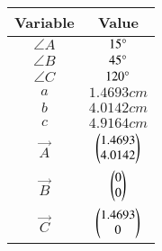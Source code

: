 \begin{tabular}[12pt]{ |c|c|}
    \hline
	\textbf{Variable} & \textbf{Value} \\
    \hline
	$\angle A$ & $15\degree$ \\
    \hline
	$\angle B$ & $45\degree$ \\
    \hline 
	$\angle C$ & $120\degree$ \\
    \hline
    $a$ & $1.4693cm$ \\
    \hline
	$b$ & $4.0142cm$ \\
    \hline 
	$c$ & $4.9164cm$ \\
    \hline
    $\vec{A}$ & $\begin{pmatrix}1.4693\\4.0142\end{pmatrix}$ \\
    \hline
    $\vec{B}$ & $\begin{pmatrix}0\\0\end{pmatrix}$ \\
    \hline 
    $\vec{C}$ & $\begin{pmatrix}1.4693\\0\end{pmatrix}$ \\
    \hline


\end{tabular}
